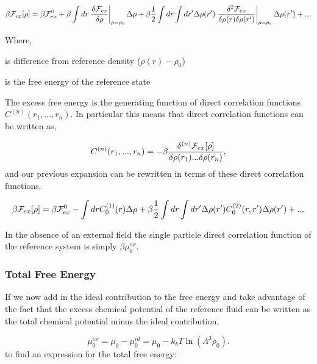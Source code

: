 \begin{equation}
    \beta\mathcal{F}_{ex}[\rho] = \beta\mathcal{F}_{ex}^0 +
    \beta\int dr \left.\frac{\delta\mathcal{F}_{ex}}{\delta\rho}\right\vert_{\rho = \rho_0} \Delta\rho
    + \beta\frac{1}{2}\int dr \int dr^\prime \Delta\rho(r^\prime)\left.\frac{\delta^2\mathcal{F}_{ex}}{\delta\rho(r)\delta\rho(r^\prime)}\right\vert_{\rho=\rho_0}\Delta\rho(r^\prime) + ...
\end{equation}

Where,
\begin{description}[labelindent=10pt, labelsep=10pt]
    \item[$\Delta\rho$] is difference from reference density ($\rho(r) - \rho_0$)
    \item[$\F_{ex}^0$] is the free energy of the reference state
\end{description}

The excess free energy is the generating function of direct correlation functions $C^(n)(r_1, ..., r_n)$.
In particular this means that direct correlation functions can be written as,

\begin{equation}
    C^{(n)}(r_1, ..., r_n) = -\beta \frac{\delta^{(n)}\mathcal{F}_{ex}[\rho]}{\delta\rho(r_1)...\delta\rho(r_n)},
\end{equation}
and our previous expansion can be rewritten in terms of these direct correlation functions.

\begin{equation}
    \beta\mathcal{F}_{ex}[\rho] = \beta\mathcal{F}_{ex}^0 - \int dr C^{(1)}_0(r) \Delta\rho
    + \beta\frac{1}{2}\int dr \int dr^\prime \Delta\rho(r^\prime)C^{(2)}_0(r, r^\prime)\Delta\rho(r^\prime) + ...
\end{equation}

In the absence of an external field the single particle direct correlation function of the reference system is simply $\beta\mu^{ex}_0$.

\subsubsection{Total Free Energy}
If we now add in the ideal contribution to the free energy and take advantage of the fact that the excess chemical potential of the reference fluid can be written as the total chemical potential minus the ideal contribution,

\begin{equation}
    \mu^{ex}_0 = \mu_0 - \mu^{id}_0 = \mu_0 - k_bT\ln(\Lambda^3\rho_0).
\end{equation}
to find an expression for the total free energy:


